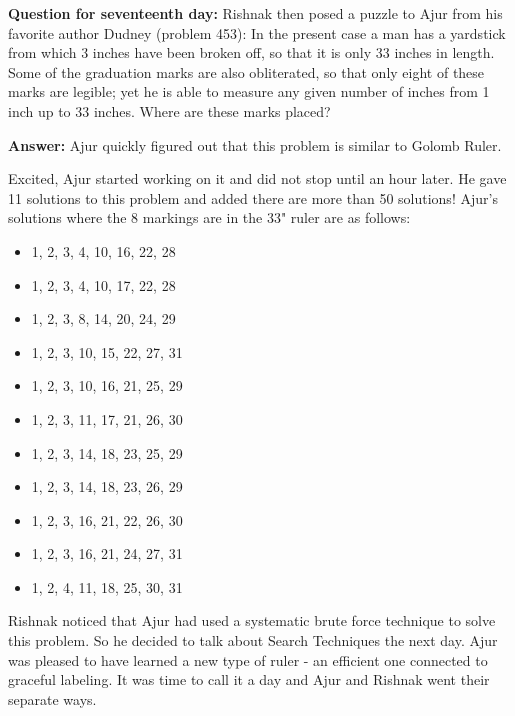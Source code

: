 \textbf{Question for seventeenth day:} Rishnak then posed a puzzle to Ajur from his favorite author Dudney (problem 453):
In the present case a man has a yardstick from which 3 inches have
been broken off, so that it is only 33 inches in length. Some of the graduation
marks are also obliterated, so that only eight of these marks are legible; yet
he is able to measure any given number of inches from 1 inch up to 33 inches.
Where are these marks placed? 

\textbf{Answer:} Ajur quickly figured out that this problem is similar to Golomb Ruler. 

Excited, Ajur started working on it and did not stop until an hour later. He gave 11 solutions to this problem and added there are more than 50 solutions! Ajur's solutions where the 8 markings are in the 33" ruler are as follows:
\begin{itemize}
    \item 1, 2, 3, 4, 10, 16, 22, 28
    \item 1, 2, 3, 4, 10, 17, 22,  28
    \item 1, 2, 3, 8, 14, 20, 24, 29
    \item 1, 2, 3, 10, 15, 22, 27, 31
    \item 1, 2, 3, 10, 16, 21, 25, 29
     \item 1, 2, 3, 11, 17, 21, 26, 30
     \item 1, 2, 3, 14, 18, 23, 25, 29
     \item 1, 2, 3, 14, 18, 23, 26, 29
     \item 1, 2, 3, 16, 21, 22, 26, 30
     \item 1, 2, 3, 16, 21, 24, 27, 31
     \item 1, 2, 4, 11, 18, 25, 30, 31
\end{itemize}
Rishnak noticed that Ajur had used a systematic brute force technique to solve this problem. So he decided to talk about Search Techniques the next day.
Ajur was pleased to have learned a new type of ruler - an efficient one connected to graceful labeling. It was time to call it a day and Ajur and Rishnak went their separate ways.